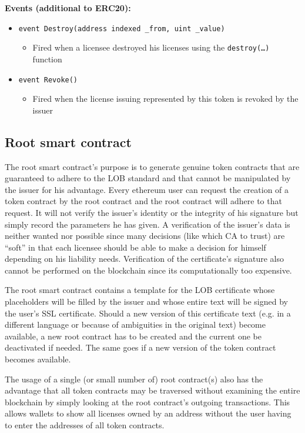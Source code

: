 \documentclass[a4paper]{article}
\begin{document}
\textbf{Events (additional to ERC20):}

\begin{itemize}
  \item \texttt{event Destroy(address indexed \_from, uint \_value)}
  \begin{itemize}
    \item Fired when a licensee destroyed his licenses using the \texttt{destroy(…)} function
  \end{itemize}
  
  \item \texttt{event Revoke()}
  \begin{itemize}
    \item Fired when the license issuing represented by this token is revoked by the issuer
  \end{itemize}
\end{itemize}

\subsection{Root smart contract}

The root smart contract's purpose is to generate genuine token contracts that are guaranteed to adhere to the LOB standard and that cannot be manipulated by the issuer for his advantage. Every ethereum user can request the creation of a token contract by the root contract and the root contract will adhere to that request. It will not verify the issuer's identity or the integrity of his signature but simply record the parameters he has given. A verification of the issuer's data is neither wanted nor possible since many decisions (like which CA to trust) are “soft” in that each licensee should be able to make a decision for himself depending on his liability needs. Verification of the certificate's signature also cannot be performed on the blockchain since its computationally too expensive.

The root smart contract contains a template for the LOB certificate whose placeholders will be filled by the issuer and whose entire text will be signed by the user's SSL certificate. Should a new version of this certificate text (e.g. in a different language or because of ambiguities in the original text) become available, a new root contract has to be created and the current one be deactivated if needed. The same goes if a new version of the token contract becomes available.

The usage of a single (or small number of) root contract(s) also has the advantage that all token contracts may be traversed without examining the entire blockchain by simply looking at the root contract's outgoing transactions. This allows wallets to show all licenses owned by an address without the user having to enter the addresses of all token contracts.
\end{document}
